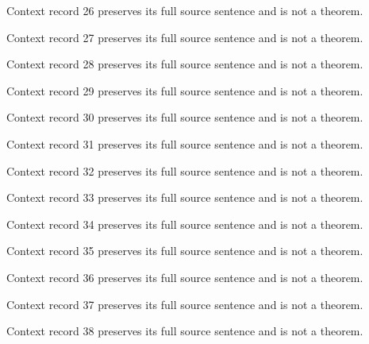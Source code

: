 \documentclass{article}
\begin{document}
\begin{remark}\label{train:context:26}Context record 26 preserves its full source sentence and is not a theorem.\end{remark}
\begin{remark}\label{train:context:27}Context record 27 preserves its full source sentence and is not a theorem.\end{remark}
\begin{remark}\label{train:context:28}Context record 28 preserves its full source sentence and is not a theorem.\end{remark}
\begin{remark}\label{train:context:29}Context record 29 preserves its full source sentence and is not a theorem.\end{remark}
\begin{remark}\label{train:context:30}Context record 30 preserves its full source sentence and is not a theorem.\end{remark}
\begin{remark}\label{train:context:31}Context record 31 preserves its full source sentence and is not a theorem.\end{remark}
\begin{remark}\label{train:context:32}Context record 32 preserves its full source sentence and is not a theorem.\end{remark}
\begin{remark}\label{train:context:33}Context record 33 preserves its full source sentence and is not a theorem.\end{remark}
\begin{remark}\label{train:context:34}Context record 34 preserves its full source sentence and is not a theorem.\end{remark}
\begin{remark}\label{train:context:35}Context record 35 preserves its full source sentence and is not a theorem.\end{remark}
\begin{remark}\label{train:context:36}Context record 36 preserves its full source sentence and is not a theorem.\end{remark}
\begin{remark}\label{train:context:37}Context record 37 preserves its full source sentence and is not a theorem.\end{remark}
\begin{remark}\label{train:context:38}Context record 38 preserves its full source sentence and is not a theorem.\end{remark}
\end{document}
